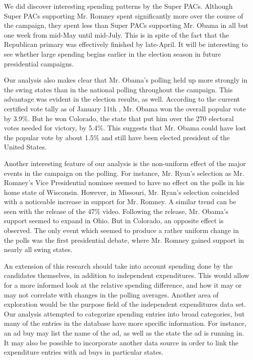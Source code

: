 \documentclass[11pt]{article}\usepackage{graphicx, color}
\begin{document}
We did discover interesting spending patterns by the Super PACs. Although Super PACs supporting Mr. Romney spent significantly more over the course of the campaign, they spent less than Super PACs supporting Mr. Obama in all but one week from mid-May until mid-July. This is in spite of the fact that the Republican primary was effectively finished by late-April. It will be interesting to see whether large spending begins earlier in the election season in future presidential campaigns.

Our analysis also makes clear that Mr. Obama's polling held up more strongly in the swing states than in the national polling throughout the campaign. This advantage was evident in the election results, as well. According to the current certified vote tally as of January 11th \cite{dw-vote}, Mr. Obama won the overall popular vote by 3.9\%. But he won Colorado, the state that put him over the 270 electoral votes needed for victory, by 5.4\%. This suggests that Mr. Obama could have lost the popular vote by about 1.5\% and still have been elected president of the United States.

Another interesting feature of our analysis is the non-uniform effect of the major events in the campaign on the polling. For instance, Mr. Ryan's selection as Mr. Romney's Vice Presidential nominee seemed to have no effect on the polls in his home state of Wisconsin. However, in Missouri, Mr. Ryan's selection coincided with a noticeable increase in support for Mr. Romney. A similar trend can be seen with the release of the 47\% video. Following the release, Mr. Obama's support seemed to expand in Ohio. But in Colorado, an opposite effect is observed. The only event which seemed to produce a rather uniform change in the polls was the first presidential debate, where Mr. Romney gained support in nearly all swing states.

An extension of this research should take into account spending done by the candidates themselves, in addition to independent expenditures. This would allow for a more informed look at the relative spending difference, and how it may or may not correlate with changes in the polling averages. Another area of exploration would be the purpose field of the independent expenditures data set. Our analysis attempted to categorize spending entries into broad categories, but many of the entries in the database have more specific information. For instance, an ad buy may list the name of the ad, as well as the state the ad is running in. It may also be possible to incorporate another data source in order to link the expenditure entries with ad buys in particular states.


\printbibliography
\end{document}

